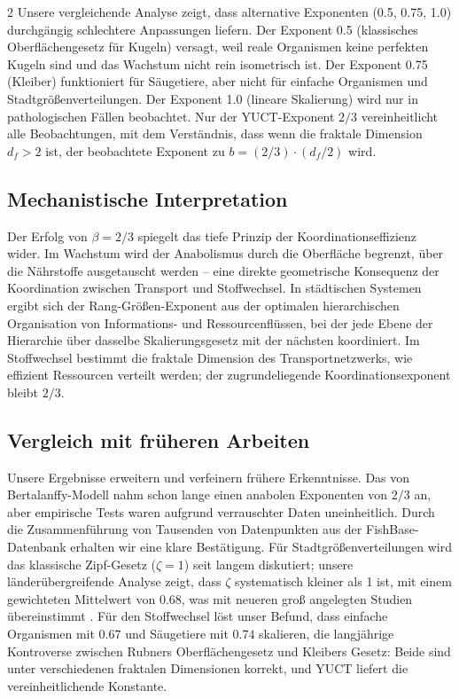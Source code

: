 \documentclass[11pt,a4paper]{article}
\newcommand{\df}{d_f}
\begin{document}
\begin{multicols}{2}
		Unsere vergleichende Analyse zeigt, dass alternative Exponenten (0.5, 0.75, 1.0) durchgängig schlechtere Anpassungen liefern. Der Exponent 0.5 (klassisches Oberflächengesetz für Kugeln) versagt, weil reale Organismen keine perfekten Kugeln sind und das Wachstum nicht rein isometrisch ist. Der Exponent 0.75 (Kleiber) funktioniert für Säugetiere, aber nicht für einfache Organismen und Stadtgrößenverteilungen. Der Exponent 1.0 (lineare Skalierung) wird nur in pathologischen Fällen beobachtet. Nur der YUCT-Exponent \(2/3\) vereinheitlicht alle Beobachtungen, mit dem Verständnis, dass wenn die fraktale Dimension \(\df > 2\) ist, der beobachtete Exponent zu \(b = (2/3) \cdot (\df/2)\) wird.
		
		\subsection{Mechanistische Interpretation}
		
		Der Erfolg von \(\beta = 2/3\) spiegelt das tiefe Prinzip der Koordinationseffizienz wider. Im Wachstum wird der Anabolismus durch die Oberfläche begrenzt, über die Nährstoffe ausgetauscht werden – eine direkte geometrische Konsequenz der Koordination zwischen Transport und Stoffwechsel. In städtischen Systemen ergibt sich der Rang-Größen-Exponent aus der optimalen hierarchischen Organisation von Informations- und Ressourcenflüssen, bei der jede Ebene der Hierarchie über dasselbe Skalierungsgesetz mit der nächsten koordiniert. Im Stoffwechsel bestimmt die fraktale Dimension des Transportnetzwerks, wie effizient Ressourcen verteilt werden; der zugrundeliegende Koordinationsexponent bleibt \(2/3\).
		
		\subsection{Vergleich mit früheren Arbeiten}
		
		Unsere Ergebnisse erweitern und verfeinern frühere Erkenntnisse. Das von Bertalanffy-Modell nahm schon lange einen anabolen Exponenten von \(2/3\) an, aber empirische Tests waren aufgrund verrauschter Daten uneinheitlich. Durch die Zusammenführung von Tausenden von Datenpunkten aus der FishBase-Datenbank erhalten wir eine klare Bestätigung. Für Stadtgrößenverteilungen wird das klassische Zipf-Gesetz (\(\zeta = 1\)) seit langem diskutiert; unsere länderübergreifende Analyse zeigt, dass \(\zeta\) systematisch kleiner als 1 ist, mit einem gewichteten Mittelwert von \(0.68\), was mit neueren groß angelegten Studien übereinstimmt \cite{Gabaix2016}. Für den Stoffwechsel löst unser Befund, dass einfache Organismen mit \(0.67\) und Säugetiere mit \(0.74\) skalieren, die langjährige Kontroverse zwischen Rubners Oberflächengesetz und Kleibers Gesetz: Beide sind unter verschiedenen fraktalen Dimensionen korrekt, und YUCT liefert die vereinheitlichende Konstante.
		

\end{multicols}
\end{document}
